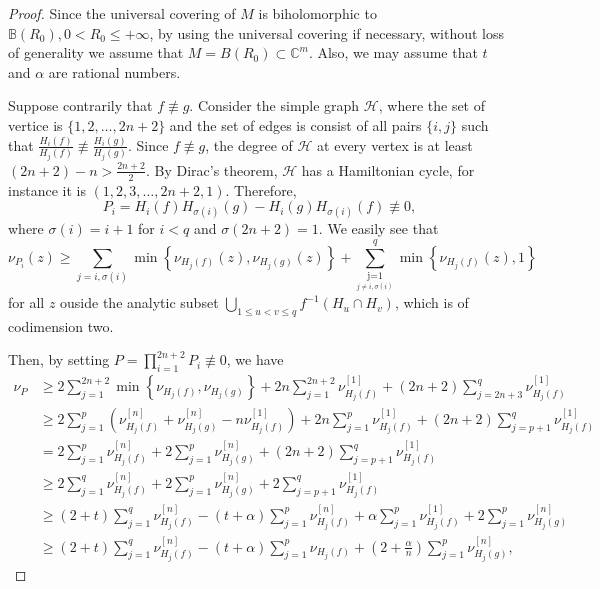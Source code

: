 \documentclass[12pt, a4paper, oneside]{amsart}
\def\underset#1#2{{\mathrel{\mathop {{}_{} {#2}}\limits_{{#1}_{}}}}}
\newcommand{\C}{{\mathbb{C}}}
\newcommand{\B}{\mathbb{B}}
\numberwithin{equation}{section}
\begin{document}
\begin{proof}
Since the universal covering of $M$ is biholomorphic to $\B(R_0), 0<R_{0} \leq+\infty$, by using the universal covering if necessary, without loss of generality we assume that $M=B(R_0) \subset \C^m$. Also, we may assume that $t$ and $\alpha$ are rational numbers.

Suppose contrarily that $f\not\equiv g$. Consider the simple graph $\mathcal H$, where the set of vertice is $\{1,2,\ldots,2n+2\}$ and the set of edges is consist of all pairs $\{i,j\}$ such that $\frac{H_i(f)}{H_j(f)}\not\equiv\frac{H_i(g)}{H_j(g)}$. Since $f\not\equiv g$, the degree of $\mathcal H$ at every vertex is at least $(2n+2)-n>\frac{2n+2}{2}$. By Dirac's theorem, $\mathcal H$ has a Hamiltonian cycle, for instance it is $(1,2,3,\ldots,2n+2,1)$. Therefore, 
$$P_{i}=H_{i}(f) H_{\sigma(i)}(g)-H_{i}(g) H_{\sigma(i)}(f)\not\equiv 0,$$
where $\sigma(i)=i+1$ for $i<q$ and $\sigma(2n+2)=1$. We easily see that 
$$\nu_{P_i}(z)\geq \sum_{j=i,\sigma(i)}\min \left\{\nu_{H_j(f)}(z), \nu_{H_j(g)}(z)\right\}+\sum_{\underset{j\ne i,\sigma(i)}{j=1}}^{q}\min \left\{\nu_{H_j(f)}(z),1\right\}$$
for all $z$ ouside the analytic subset $\bigcup_{1\le u<v\le q}f^{-1}(H_u\cap H_v)$, which is of codimension two.

Then, by setting $P=\prod_{i=1}^{2n+2} P_{i} \not \equiv 0$, we have
\begin{align*}
\nu_{P}&\geq 2\sum_{j=1}^{2n+2}\min \left\{\nu_{H_j(f)}, \nu_{H_j(g)}\right\}+2n\sum_{j=1}^{2n+2}\nu^{[1]}_{H_j(f)}+(2n+2)\sum_{j=2n+3}^q\nu^{[1]}_{H_j(f)}\\
&\geq 2\sum_{j=1}^p\left (\nu^{[n]}_{H_j(f)}+\nu^{[n]}_{H_j(g)}-n\nu^{[1]}_{H_j(f)}\right)+2n\sum_{j=1}^p\nu^{[1]}_{H_j(f)}+(2n+2)\sum_{j=p+1}^q\nu^{[1]}_{H_j(f)}\\
&= 2\sum_{j=1}^p\nu^{[n]}_{H_j(f)}+2\sum_{j=1}^p\nu^{[n]}_{H_j(g)}+(2n+2)\sum_{j=p+1}^q\nu^{[1]}_{H_j(f)}\\
&\ge  2\sum_{j=1}^q\nu^{[n]}_{H_j(f)}+2\sum_{j=1}^p\nu^{[n]}_{H_j(g)}+2\sum_{j=p+1}^q\nu^{[1]}_{H_j(f)}\\
&\ge  (2+t)\sum_{j=1}^q\nu^{[n]}_{H_j(f)}-(t+\alpha)\sum_{j=1}^p\nu^{[n]}_{H_j(f)}+\alpha\sum_{j=1}^p\nu^{[1]}_{H_j(f)}+2\sum_{j=1}^p\nu^{[n]}_{H_j(g)}\\
&\ge (2+t)\sum_{j=1}^q\nu^{[n]}_{H_j(f)}-(t+\alpha)\sum_{j=1}^p\nu_{H_j(f)}+\left(2+\frac{\alpha}{n}\right)\sum_{j=1}^p\nu^{[n]}_{H_j(g)},
\end{align*}



\end{proof}
\end{document}
